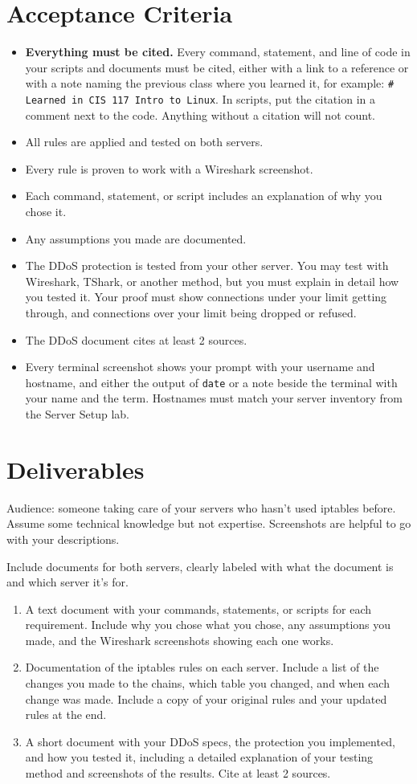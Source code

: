 \documentclass[12pt]{article}
\begin{document}
\section*{Acceptance Criteria}
\begin{itemize}
    \item \textbf{Everything must be cited.} Every command, statement, and line of code in your scripts and documents must be cited, either with a link to a reference or with a note naming the previous class where you learned it, for example: \texttt{\# Learned in CIS 117 Intro to Linux}. In scripts, put the citation in a comment next to the code. Anything without a citation will not count.
    \item All rules are applied and tested on both servers.
    \item Every rule is proven to work with a Wireshark screenshot.
    \item Each command, statement, or script includes an explanation of why you chose it.
    \item Any assumptions you made are documented.
    \item The DDoS protection is tested from your other server. You may test with Wireshark, TShark, or another method, but you must explain in detail how you tested it. Your proof must show connections under your limit getting through, and connections over your limit being dropped or refused.
    \item The DDoS document cites at least 2 sources.
    \item Every terminal screenshot shows your prompt with your username and hostname, and either the output of \texttt{date} or a note beside the terminal with your name and the term. Hostnames must match your server inventory from the Server Setup lab.
\end{itemize}

\section*{Deliverables}
Audience: someone taking care of your servers who hasn't used iptables before. Assume some technical knowledge but not expertise. Screenshots are helpful to go with your descriptions.

Include documents for both servers, clearly labeled with what the document is and which server it's for.
\begin{enumerate}
    \item A text document with your commands, statements, or scripts for each requirement. Include why you chose what you chose, any assumptions you made, and the Wireshark screenshots showing each one works.
    \item Documentation of the iptables rules on each server. Include a list of the changes you made to the chains, which table you changed, and when each change was made. Include a copy of your original rules and your updated rules at the end.
    \item A short document with your DDoS specs, the protection you implemented, and how you tested it, including a detailed explanation of your testing method and screenshots of the results. Cite at least 2 sources.
\end{enumerate}
\end{document}
